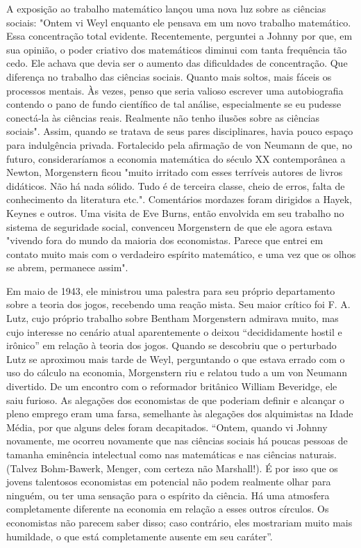 \documentclass[a4paper,12pt]{article}[abntex2]
\begin{document}
A exposição ao trabalho matemático lançou uma nova luz sobre as ciências sociais: "Ontem vi Weyl enquanto ele pensava em um novo trabalho matemático. Essa concentração total evidente. Recentemente, perguntei a Johnny por que, em sua opinião, o poder criativo dos matemáticos diminui com tanta frequência tão cedo. Ele achava que devia ser o aumento das dificuldades de concentração. Que diferença no trabalho das ciências sociais. Quanto mais soltos, mais fáceis os processos mentais. Às vezes, penso que seria valioso escrever uma autobiografia contendo o pano de fundo científico de tal análise, especialmente se eu pudesse conectá-la às ciências reais. Realmente não tenho ilusões sobre as ciências sociais". Assim, quando se tratava de seus pares disciplinares, havia pouco espaço para indulgência privada. Fortalecido pela afirmação de von Neumann de que, no futuro, consideraríamos a economia matemática do século XX contemporânea a Newton, Morgenstern ficou "muito irritado com esses terríveis autores de livros didáticos. Não há nada sólido. Tudo é de terceira classe, cheio de erros, falta de conhecimento da literatura etc.". Comentários mordazes foram dirigidos a Hayek, Keynes e outros. Uma visita de Eve Burns, então envolvida em seu trabalho no sistema de seguridade social, convenceu Morgenstern de que ele agora estava "vivendo fora do mundo da maioria dos economistas. Parece que entrei em contato muito mais com o verdadeiro espírito matemático, e uma vez que os olhos se abrem, permanece assim".

Em maio de 1943, ele ministrou uma palestra para seu próprio departamento sobre a teoria dos jogos, recebendo uma reação mista. Seu maior crítico foi F. A. Lutz, cujo próprio trabalho sobre Bentham Morgenstern admirava muito, mas cujo interesse no cenário atual aparentemente o deixou “decididamente hostil e irônico” em relação à teoria dos jogos. Quando se descobriu que o perturbado Lutz se aproximou mais tarde de Weyl, perguntando o que estava errado com o uso do cálculo na economia, Morgenstern riu e relatou tudo a um von Neumann divertido. De um encontro com o reformador britânico William Beveridge, ele saiu furioso. As alegações dos economistas de que poderiam definir e alcançar o pleno emprego eram uma farsa, semelhante às alegações dos alquimistas na Idade Média, por que alguns deles foram decapitados. “Ontem, quando vi Johnny novamente, me ocorreu novamente que nas ciências sociais há poucas pessoas de tamanha eminência intelectual como nas matemáticas e nas ciências naturais. (Talvez Bohm-Bawerk, Menger, com certeza não Marshall!). É por isso que os jovens talentosos economistas em potencial não podem realmente olhar para ninguém, ou ter uma sensação para o espírito da ciência. Há uma atmosfera completamente diferente na economia em relação a esses outros círculos. Os economistas não parecem saber disso; caso contrário, eles mostrariam muito mais humildade, o que está completamente ausente em seu caráter”.
\end{document}
